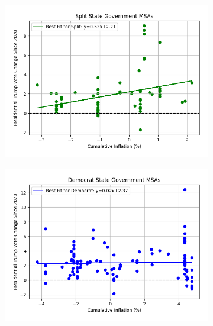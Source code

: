 \documentclass{article}
\begin{document}
\begin{figure}[ht]
\centering
\begin{subfigure}[b]{0.4\textwidth}
    \centering
    \includegraphics[width=\textwidth]{pres_goods_Split_msa_swing_scatter.png}
\end{subfigure}
\begin{subfigure}[b]{0.4\textwidth}
    \centering
    \includegraphics[width=\textwidth]{pres_goods_D_msa_swing_scatter.png}
\end{subfigure}


\end{figure}
\end{document}
